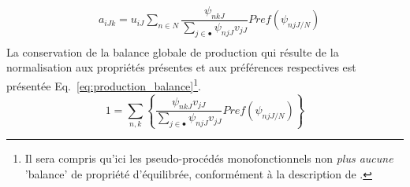 \begin{equation}
  \begin{split}
  & a_{iJk}=u_{iJ}\displaystyle\sum_{n \in N}\dfrac{\psi_{nkJ}}{\displaystyle\sum_{j\in\bullet}\psi_{njJ}v_{jJ}} \mathit{Pref}(\psi_{njJ/N})
  \\
  \end{split}
  \label{eq:technical_coefficient_multicriteria}
\end{equation}
La conservation de la balance globale de production qui résulte de la normalisation aux propriétés présentes et aux préférences respectives est présentée Eq.~\eqref{eq:production_balance}\footnote{Il sera compris qu'ici les pseudo-procédés monofonctionnels non \emph{plus aucune} 'balance' de propriété d'équilibrée, conformément à la description de \citeauthor{weidema_avoiding_2010}.}.
%
%
\begin{equation}
1 = \displaystyle\sum_{n,k}\left\{\frac{\psi_{nkJ}v_{jJ}}{\displaystyle\sum_{j\in\bullet}\psi_{njJ}v_{jJ}} \mathit{Pref}(\psi_{njJ/N}) \right\}
\label{eq:production_balance}
\end{equation}
%

